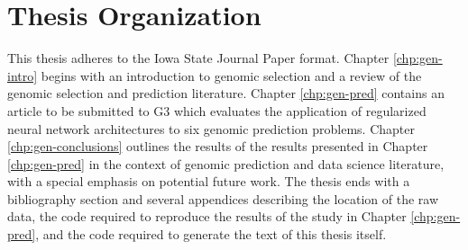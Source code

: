 \section{Thesis Organization}

This thesis adheres to the Iowa State Journal Paper format. 
Chapter \ref{chp:gen-intro} begins with an introduction to genomic selection and a review of the
genomic selection and prediction literature. Chapter \ref{chp:gen-pred} contains an article to be 
submitted to G3 which evaluates the application of regularized neural network architectures to six genomic
prediction problems. Chapter \ref{chp:gen-conclusions} outlines the results of the results presented
in Chapter \ref{chp:gen-pred} in the context of genomic prediction and data science literature, with a special
emphasis on potential future work. The thesis ends with a bibliography section and several appendices describing
the location of the raw data, the code required to reproduce the results of the study in Chapter \ref{chp:gen-pred}, and
the code required to generate the text of this thesis itself.


